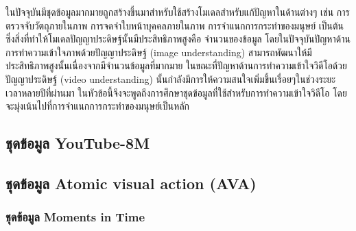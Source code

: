 \label{sec:dataset}
ในปัจจุบันมีชุดข้อมูลมากมายถูกสร้างขึ้นมาสำหรับใช้สร้างโมเดลสำหรับแก้ปัญหาในด้านต่างๆ เช่น การตรวจจับวัตถุภายในภาพ
การจดจำใบหน้าบุคคลภายในภาพ การจำแนกการกระทำของมนุษย์ เป็นต้น ซึ่งสิ่งที่ทำให้โมเดลปัญญาประดิษฐ์นั้นมีประสิทธิภาพสูงคือ
จำนวนของข้อมูล โดยในปัจจุบันปัญหาด้านการทำความเข้าใจภาพด้วยปัญญาประดิษฐ์ (image understanding) 
สามารถพัฒนาให้มีประสิทธิภาพสูงนั้นเนื่องจากมีจำนวนข้อมูลที่มากมาย ในขณะที่ปัญหาด้านการทำความเข้าใจวิดีโอด้วยปัญญาประดิษฐ์ (video understanding) 
นั้นกำลังมีการให้ความสนใจเพิ่มขึ้นเรื่อยๆในช่วงระยะเวลาหลายปีที่ผ่านมา ในหัวข้อนี้จึงจะพูดถึงการศึกษาชุดข้อมูลที่ใช้สำหรับการทำความเข้าใจวิดีโอ 
โดยจะมุ่งเน้นไปที่การจำแนกการกระทำของมนุษย์เป็นหลัก

\subsection*{ชุดข้อมูล YouTube-8M} 

\clearpage
\subsection*{ชุดข้อมูล Atomic visual action (AVA)}	

\clearpage
\subsubsection*{ชุดข้อมูล Moments in Time}
